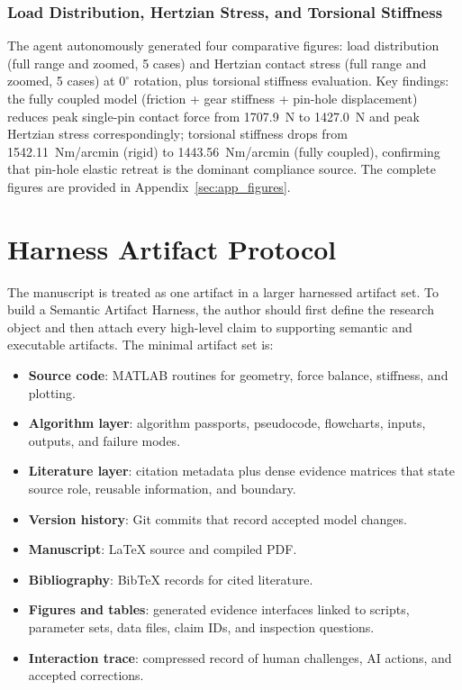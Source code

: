 \documentclass{article}
\begin{document}
\subsubsection{Load Distribution, Hertzian Stress, and Torsional Stiffness}
\label{sec:parametric_results}

The agent autonomously generated four comparative figures: load distribution (full range and zoomed, 5 cases) and Hertzian contact stress (full range and zoomed, 5 cases) at $0^\circ$ rotation, plus torsional stiffness evaluation. Key findings: the fully coupled model (friction + gear stiffness + pin-hole displacement) reduces peak single-pin contact force from 1707.9~N to 1427.0~N and peak Hertzian stress correspondingly; torsional stiffness drops from 1542.11~Nm/arcmin (rigid) to 1443.56~Nm/arcmin (fully coupled), confirming that pin-hole elastic retreat is the dominant compliance source. The complete figures are provided in Appendix~\ref{sec:app_figures}.

\section{Harness Artifact Protocol}

The manuscript is treated as one artifact in a larger harnessed artifact set. To build a Semantic Artifact Harness, the author should first define the research object and then attach every high-level claim to supporting semantic and executable artifacts. The minimal artifact set is:

\begin{itemize}
    \item \textbf{Source code}: MATLAB routines for geometry, force balance, stiffness, and plotting.
    \item \textbf{Algorithm layer}: algorithm passports, pseudocode, flowcharts, inputs, outputs, and failure modes.
    \item \textbf{Literature layer}: citation metadata plus dense evidence matrices that state source role, reusable information, and boundary.
    \item \textbf{Version history}: Git commits that record accepted model changes.
    \item \textbf{Manuscript}: LaTeX source and compiled PDF.
    \item \textbf{Bibliography}: BibTeX records for cited literature.
    \item \textbf{Figures and tables}: generated evidence interfaces linked to scripts, parameter sets, data files, claim IDs, and inspection questions.
    \item \textbf{Interaction trace}: compressed record of human challenges, AI actions, and accepted corrections.
\end{itemize}
\end{document}
